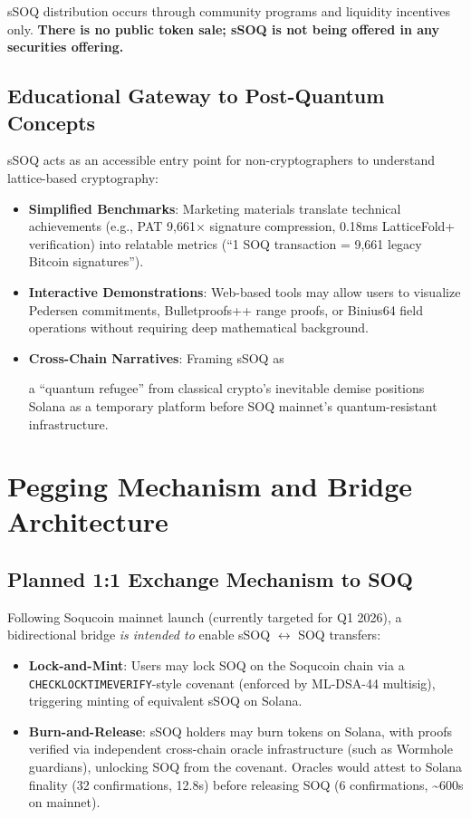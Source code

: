 \documentclass[10pt]{article}
\begin{document}
sSOQ distribution occurs through community programs and liquidity incentives only. \textbf{There is no public token sale; sSOQ is not being offered in any securities offering.}

\subsection{Educational Gateway to Post-Quantum Concepts}

sSOQ acts as an accessible entry point for non-cryptographers to understand lattice-based cryptography:

\begin{itemize}
    \item \textbf{Simplified Benchmarks}: Marketing materials translate technical achievements (e.g., PAT 9,661× signature compression, 0.18ms LatticeFold+ verification) into relatable metrics (``1 SOQ transaction = 9,661 legacy Bitcoin signatures'').
    \item \textbf{Interactive Demonstrations}: Web-based tools may allow users to visualize Pedersen commitments, Bulletproofs++ range proofs, or Binius64 field operations without requiring deep mathematical background.
    \item \textbf{Cross-Chain Narratives}: Framing sSOQ as

 a ``quantum refugee'' from classical crypto's inevitable demise positions Solana as a temporary platform before SOQ mainnet's quantum-resistant infrastructure.
\end{itemize}

\section{Pegging Mechanism and Bridge Architecture}

\subsection{Planned 1:1 Exchange Mechanism to SOQ}

Following Soqucoin mainnet launch (currently targeted for Q1 2026), a bidirectional bridge \textit{is intended to} enable sSOQ $\leftrightarrow$ SOQ transfers:

\begin{itemize}
    \item \textbf{Lock-and-Mint}: Users may lock SOQ on the Soqucoin chain via a \texttt{CHECKLOCKTIMEVERIFY}-style covenant (enforced by ML-DSA-44 multisig), triggering minting of equivalent sSOQ on Solana.
    \item \textbf{Burn-and-Release}: sSOQ holders may burn tokens on Solana, with proofs verified via independent cross-chain oracle infrastructure (such as Wormhole guardians), unlocking SOQ from the covenant. Oracles would attest to Solana finality (32 confirmations, 12.8s) before releasing SOQ (6 confirmations, \textasciitilde600s on mainnet).
\end{itemize}
\end{document}

